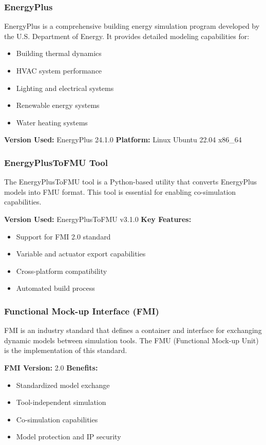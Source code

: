 \documentclass[12pt,a4paper]{article}
\begin{document}
\subsubsection{EnergyPlus}
EnergyPlus is a comprehensive building energy simulation program developed by the U.S. Department of Energy. It provides detailed modeling capabilities for:
\begin{itemize}
    \item Building thermal dynamics
    \item HVAC system performance
    \item Lighting and electrical systems
    \item Renewable energy systems
    \item Water heating systems
\end{itemize}

\textbf{Version Used:} EnergyPlus 24.1.0
\textbf{Platform:} Linux Ubuntu 22.04 x86\_64

\subsubsection{EnergyPlusToFMU Tool}
The EnergyPlusToFMU tool is a Python-based utility that converts EnergyPlus models into FMU format. This tool is essential for enabling co-simulation capabilities.

\textbf{Version Used:} EnergyPlusToFMU v3.1.0
\textbf{Key Features:}
\begin{itemize}
    \item Support for FMI 2.0 standard
    \item Variable and actuator export capabilities
    \item Cross-platform compatibility
    \item Automated build process
\end{itemize}

\subsubsection{Functional Mock-up Interface (FMI)}
FMI is an industry standard that defines a container and interface for exchanging dynamic models between simulation tools. The FMU (Functional Mock-up Unit) is the implementation of this standard.

\textbf{FMI Version:} 2.0
\textbf{Benefits:}
\begin{itemize}
    \item Standardized model exchange
    \item Tool-independent simulation
    \item Co-simulation capabilities
    \item Model protection and IP security
\end{itemize}
\end{document}
